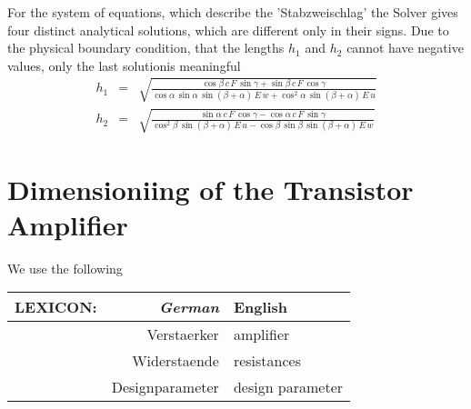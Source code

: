 For the system of equations, which describe the 
 'Stabzweischlag' the 
Solver gives four distinct analytical solutions, which are different only in their signs. 
Due to the physical boundary condition, that the lengths
$h_1$ and $h_2$ cannot have negative values, only the last solutionis  meaningful
\begin{eqnarray}
h_1 &=& \sqrt{
  \frac{
    \cos \beta \, c \, F \, \sin \gamma + \sin \beta \, c \, F \, 
    \cos \gamma
  }{
    \cos \alpha \, \sin \alpha \, \sin \left( \beta + \alpha \right) \, 
    E \, w + \cos^2 \alpha \, \sin \left( \beta + \alpha \right) \, E \, 
    u
  }
} \\
h_2 &=& \sqrt{
  \frac{
    \sin \alpha \, c \, F \, \cos \gamma - \cos \alpha \, c \, F \, 
    \sin \gamma
  }{
    \cos^2 \beta \, \sin \left( \beta + \alpha \right) \, E \, u
    - \cos \beta \, \sin \beta \, \sin \left( \beta + \alpha \right) \, 
    E \, w
  }
}
\end{eqnarray}

\clearpage
\section{Dimensioniing of the Transistor Amplifier}

We use the following

\begin{center}
\begin {tabular} {r r | l  }
{\sf LEXICON:} & {\it\color{black} German} & {\color{blue} English }  \\
\hline
   & Verstaerker & \color{blue} amplifier \\
     &  Widerstaende &  \color{blue} resistances \\
          &  Designparameter &  \color{blue} design parameter 
\end {tabular}
\end{center}



